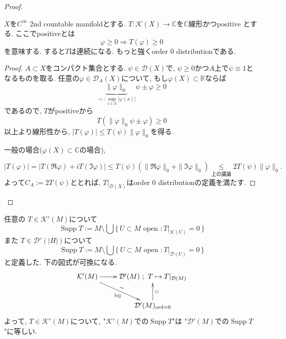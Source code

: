 \begin{proof}
\begin{tcolorbox}[mybox]
\begin{thm}
\end{thm}
\end{tcolorbox}

\begin{rem}
$X$を$C^{\infty}$ 2nd countable manifoldとする. 
$T:\mathcal{K}(X)\to \mathbb{C}$を$\mathbb{C}$線形かつpositive とする.
ここでpositiveとは
\[
\varphi\geq 0 \Rightarrow T(\varphi)\geq 0
\]
を意味する. すると$T$は連続になる. もっと強くorder $0$ distributionである. 
\begin{proof}
$A\subset X$をコンパクト集合とする. 
 $\psi\in \mathcal{D}(X)$で, $\psi\geq 0$かつ$A$上で$\psi \equiv 1$となるものを取る. 
任意の$\varphi\in \mathcal{D}_A(X)$について, 
もし$\varphi(X)\subset \mathbb{R}$ならば
\[
\underbrace{\|\varphi\|_0}_{=:\sup_{x\in X} |\varphi(x)|}\psi \pm \varphi \geq 0
\]
であるので, $T$がpositiveから
\[
T(\|\varphi\|_0\psi \pm \varphi)\geq 0
\]
以上より線形性から, 
\( |T(\varphi)|\leq T(\psi)\|\varphi\|_0
\)を得る.

一般の場合($\varphi(X)\subset \mathbb{C}$の場合), 

\[
|T(\varphi)|=\left|T(\Re\varphi)+iT(\Im\varphi)\right|
\leq T(\psi)(\|\Re\varphi\|_0+\|\Im\varphi\|_0)
\underset{\text{上の議論}}{\leq} 2T(\psi)\|\varphi\|_0.
\]
よって$C_A:=2T(\psi)$ととれば, $T|_{\mathcal{D}(X)}$はorder $0$ distributionの定義を満たす. 
\end{proof}
\end{rem}

\end{proof}


任意の \(T \in \mathcal{K}'(M)\)について
\[
\operatorname{Supp} T := M \setminus \bigcup \{\, U \subset M \text{ open }  : T|_{\mathcal{K}(U)} = 0 \,\}\]
また \(T \in \mathcal{D}'(|H|)\)について
\[\operatorname{Supp} T := M \setminus \bigcup \{\, U \subset M \text{ open } : T|_{\mathcal{D}(U)} = 0 \,\}\]
と定義した. 下の図式が可換になる.
\[
\xymatrix{
\mathcal{K}'(M) \ar[r] & \mathcal{D}'(M)\ ;\ T \mapsto T|_{\mathcal{D}(M)} \\
& \mathcal{D}'(M)_{\mathrm{ord}=0} \ar[u]_{\cup} \ar@{<-}[ul]_-{\sim}^{\mathrm{bij}}
}
\]
よって, 
\(T \in \mathcal{K}'(M)\)について, "$\mathcal{K}'(M)$での$\operatorname{Supp} T$"は
"$\mathcal{D}'(M)$での$\operatorname{Supp} T$"に等しい.


